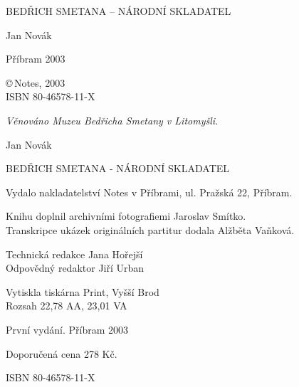 \documentclass[a4paper,twoside,11pt]{article}
\begin{document}
\begin{center}
\vspace*{0.1\textheight}
\fontsize{14}{14}\selectfont
BEDŘICH SMETANA -- NÁRODNÍ SKLADATEL

\vspace{0.4\textheight}
\selectfont
Jan Novák

\vfill
\fontsize{12}{12}\selectfont
Příbram 2003
\end{center}

\newpage
\vspace*{\fill}

{
\parindent0mm
\copyright\,Notes, 2003\\
ISBN 80-46578-11-X
}

\newpage

{
\fontsize{10}{10}\selectfont
\emph{Věnováno Muzeu Bedřicha Smetany v Litomyšli.}
}

\cleardoublepage

\fontsize{10}{10}\selectfont
\emph{}

\clearpage
\vspace*{\fill}

{
\parindent0mm
Jan Novák

\bigskip
BEDŘICH SMETANA - NÁRODNÍ SKLADATEL

\bigskip
Vydalo nakladatelství Notes v Příbrami, ul. Pražská 22, Příbram.

\bigskip
Knihu doplnil archivními fotografiemi Jaroslav Smítko.\\
Transkripce ukázek originálních partitur dodala Alžběta Vaňková.

\bigskip
Technická redakce Jana Hořejší\\
Odpovědný redaktor Jiří Urban

\bigskip
Vytiskla tiskárna Print, Vyšší Brod\\
Rozsah 22,78 AA, 23,01 VA

\bigskip
První vydání. Příbram 2003

\bigskip
Doporučená cena 278 Kč.

\bigskip
ISBN 80-46578-11-X
}
\end{document}
